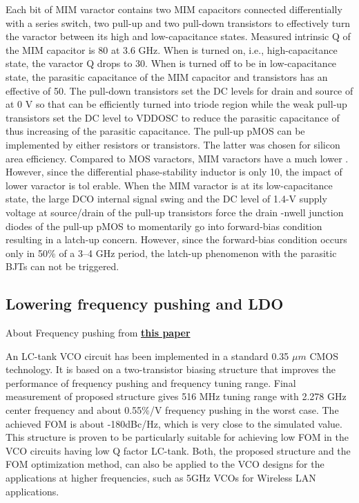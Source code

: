 \documentclass{article}
\begin{document}
\begin{info} %
Each bit of MIM varactor contains two MIM capacitors connected differentially with a series switch, two pull-up and two pull-down transistors to effectively turn the varactor between its high and low-capacitance states. Measured intrinsic Q of the MIM capacitor is 80 at 3.6 GHz. When is turned on, i.e., high-capacitance state, the varactor Q drops to 30. When is turned off to be in low-capacitance state, the parasitic capacitance of the MIM capacitor and transistors has an effective of 50. The pull-down transistors set the DC levels for drain and source of at 0 V so that
can be efficiently turned into triode region while the weak pull-up transistors set the DC level to VDDOSC to reduce the parasitic capacitance of thus increasing of the parasitic capacitance. The pull-up pMOS can be implemented by either resistors or transistors. The latter was chosen for silicon area efficiency. Compared to MOS varactors, MIM varactors have a much lower . However, since the differential phase-stability inductor is only 10, the impact of lower varactor is tol erable. When the MIM varactor is at its low-capacitance state, the large DCO internal signal swing and the DC level of 1.4-V supply voltage at source/drain of the pull-up transistors force the drain -nwell junction diodes of the pull-up pMOS to momentarily go into forward-bias condition resulting in a latch-up concern. However, since the forward-bias condition occurs only in 50\% of a 3–4 GHz period, the latch-up phenomenon with the parasitic BJTs can not be triggered.
\end{info}

\subsection{Lowering frequency pushing and LDO}

About Frequency pushing from \href{https://www.atlantis-press.com/article/6376.pdf}{\textbf{this paper}}

\begin{info} %
An LC-tank VCO circuit has been implemented in a standard 0.35 $\mu m$ CMOS technology. It is based on a two-transistor biasing structure that improves the performance of frequency pushing and frequency tuning range. Final measurement of proposed structure gives 516 MHz tuning range with 2.278 GHz center frequency and about 0.55$\%$/V frequency pushing in the worst case. The achieved FOM is about -180dBc/Hz, which is very close to the simulated value. This structure is proven to be particularly suitable for achieving low FOM in the VCO circuits having low Q factor LC-tank. Both, the proposed structure and the FOM optimization method, can also be applied to the VCO designs for the applications at higher frequencies, such as 5GHz VCOs for Wireless LAN applications.
\end{info}
\end{document}
